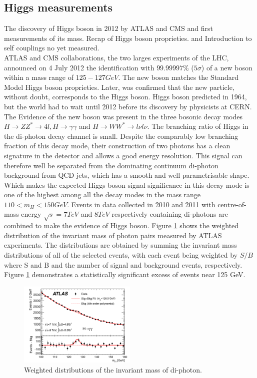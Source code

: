 \subsection{Higgs measurements}
\label{chap1:H2012:HM}
The discovery of Higgs boson in 2012 by ATLAS and CMS and first measurements of its mass.
Recap of Higgs boson proprieties. and Introduction to self couplings no yet measured. \\

ATLAS and CMS collaborations, the two larges experiments of the LHC, announced on 4 July 2012 the identification with $99.99997\%$ ($5\sigma$) of a new boson within a mass range of $125-127 GeV$. The new boson matches the Standard Model Higgs boson proprieties. Later, was confirmed that the new particle, without doubt, corresponds to the Higgs boson. Higgs boson predicted in 1964, but the world had to wait until 2012 before its discovery by physicists at CERN. The Evidence of the new boson was present in the three bosonic decay modes $H\rightarrow ZZ^* \rightarrow 4l, H\rightarrow\gamma\gamma$ and $H\rightarrow WW^*\rightarrow l\nu l\nu$. The branching ratio of Higgs in the di-photon decay channel is small. Despite the comparably low branching fraction of this decay mode, their construction of two photons has a clean signature in the detector and allows a good energy resolution. This signal can therefore well be separated from the dominating continuum di-photon background from QCD jets, which has a smooth and well parametrisable shape. Which makes the expected Higgs boson signal significance in this decay mode is one of the highest among all the decay modes in the mass range $110 < m_{H} < 150 GeV$. Events in data collected in 2010 and 2011 with centre-of-mass energy $\sqrt{s}=7 TeV$ and $8 TeV$ respectively containing di-photons are combined to make the evidence of Higgs boson. Figure \ref{fig:chap1:H2012:Hyy} shows the weighted distribution of the invariant mass of photon pairs measured by ATLAS experiments. The distributions are obtained by summing the invariant mass distributions of all of the selected events, with each event being weighted by $S/B$ where S and B and the number of signal and background events, respectively. Figure \ref{fig:chap1:H2012:Hyy} demonstrates a statistically significant excess of events near 125 GeV. \\
\begin{figure}[h!]
    \centering
    \includegraphics[width=0.5\textwidth]{Ch1/Img/Hmyy.png}
    \caption{Weighted distributions of the invariant mass of di-photon.}
    \label{fig:chap1:H2012:Hyy}
\end{figure}
